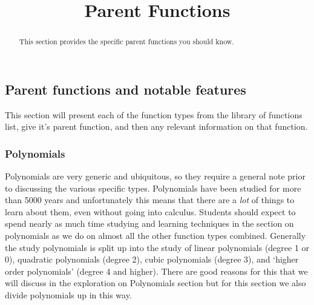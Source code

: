 \documentclass{ximera}
\title{Parent Functions}
\begin{document}
\begin{abstract}
    This section provides the specific parent functions you should know.
\end{abstract}
\maketitle





\subsection*{Parent functions and notable features}
    This section will present each of the function types from the library of functions list, give it's parent function, and then any relevant information on that function.

    \subsubsection*{Polynomials}
        Polynomials are very generic and ubiquitous, so they require a general note prior to discussing the various specific types. Polynomials have been studied for more than 5000 years and unfortunately this means that there are a \textit{lot} of things to learn about them, even without going into calculus. Students should expect to spend nearly as much time studying and learning techniques in the section on polynomials as we do on almost all the other function types combined. Generally the study polynomials is split up into the study of linear polynomials (degree 1 or 0), quadratic polynomials (degree 2), cubic polynomials (degree 3), and `higher order polynomials' (degree 4 and higher). There are good reasons for this that we will discuss in the exploration on Polynomials section but for this section we also divide polynomials up in this way.
        
\end{document}
